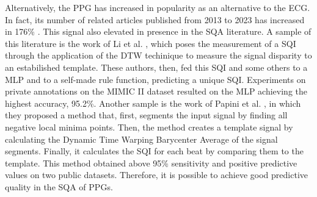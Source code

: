 Alternatively, the \gls{PPG} has increased in popularity as an alternative to the \gls{ECG}. In fact, its number of related articles published from 2013 to 2023 has increased in 176\% \cite{ppg-1}. This signal also elevated in presence in the \gls{SQA} literature. A sample of this literature is the work of Li et al. \cite{ppg-2}, which poses the measurement of a \gls{SQI} through the application of the \gls{DTW} techinique to measure the signal disparity to an estabilished template. These authors, then, fed this \gls{SQI} and some others to a \gls{MLP} and to a self-made rule function, predicting a unique \gls{SQI}. Experiments on private annotations on the MIMIC II dataset resulted on the \gls{MLP} achieving the highest accuracy, 95.2\%. Another sample is the work of Papini et al. \cite{ppg-3}, in which they proposed a method that, first, segments the input signal by finding all negative local minima points. Then, the method creates a template signal by calculating the Dynamic Time Warping Barycenter Average of the signal segments. Finally, it calculates the \gls{SQI} for each beat by comparing them to the template. This method obtained above 95\% sensitivity and positive predictive values on two public datasets. Therefore, it is possible to achieve good predictive quality in the \gls{SQA} of \gls{PPG}s.
	
		
